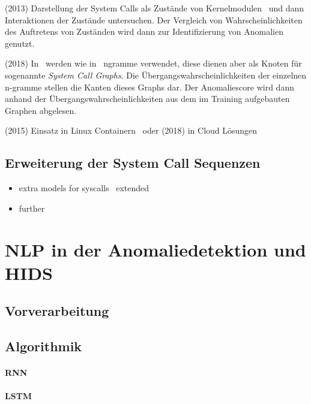         (2013) Darstellung der System Calls als Zustände von Kernelmodulen~\cite{SYSTEM_STATES} und dann Interaktionen der Zustände untersuchen.
        Der Vergleich von Wahrscheinlichkeiten des Auftretens von Zuständen wird dann zur Identifizierung von Anomalien genutzt.

        (2018) In~\cite{SYSCALL_GRAPHS} werden wie in~\cite{STIDE_Alternatives} ngramme verwendet, diese dienen aber als Knoten für sogenannte \textit{System Call Graphs}. 
        Die Übergangswahrscheinlichkeiten der einzelnen n-gramme stellen die Kanten dieses Graphs dar.
        Der Anomaliescore wird dann anhand der Übergangswahrscheinlichkeiten aus dem im Training aufgebauten Graphen abgelesen.

        (2015) Einsatz in Linux Containern~\cite{FREQUENCY1} oder (2018) in Cloud Lösungen~\cite{VM}

\subsection{Erweiterung der System Call Sequenzen}

    \begin{itemize}
        \item extra models for syscalls~\cite{ARGUMENTS} extended~\cite{MAGGI}
        \item further~\cite{ARGUMENTS2}
    \end{itemize}

\section{NLP in der Anomaliedetektion und HIDS}

\subsection{Vorverarbeitung}

\subsection{Algorithmik}

\paragraph{RNN}

\paragraph{LSTM}

